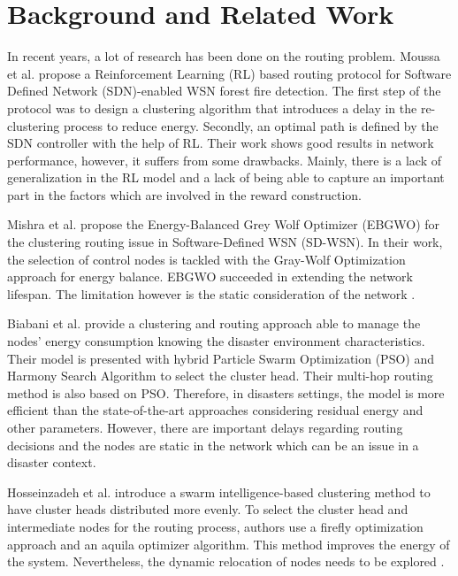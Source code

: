 \section{Background and Related Work}
In recent years, a lot of research has been done on the routing problem. Moussa et al. \cite{moussa_reinforcement_2023} propose a Reinforcement Learning (RL) based routing protocol for Software Defined Network (SDN)-enabled WSN forest fire detection. The first step of the protocol was to design a clustering algorithm that introduces a delay in the re-clustering process to reduce energy. Secondly, an optimal path is defined by the SDN controller with the help of RL. Their work shows good results in network performance, however, it suffers from some drawbacks. Mainly, there is a lack of generalization in the RL model and a lack of being able to capture an important part in the factors which are involved in the reward construction. 

Mishra et al. \cite{mishra_meta-heuristic-based_2021} propose the Energy-Balanced Grey Wolf Optimizer (EBGWO) for the clustering routing issue in Software-Defined WSN (SD-WSN). In their work, the selection of control nodes is tackled with the Gray-Wolf Optimization approach for energy balance. EBGWO succeeded in extending the network lifespan. The limitation however is the static consideration of the network \cite{isyaku_software_2024}. 

Biabani et al. \cite{biabani_energy-efficient_2020} provide a clustering and routing approach able to manage the nodes’ energy consumption knowing the disaster environment characteristics. Their model is presented with hybrid Particle Swarm Optimization (PSO) and Harmony Search Algorithm to select the cluster head. Their multi-hop routing method is also based on PSO. Therefore, in disasters settings, the model is more efficient than the state-of-the-art approaches considering residual energy and other parameters. However, there are important delays regarding routing decisions \cite{noauthor_survey_nodate} and the nodes are static in the network \cite{biabani_energy-efficient_2020} which can be an issue in a disaster context. 

Hosseinzadeh et al. \cite{hosseinzadeh_hybrid_2022} introduce a swarm intelligence-based clustering method to have cluster heads distributed more evenly. To select the cluster head and intermediate nodes for the routing process, authors use a firefly optimization approach and an aquila optimizer algorithm. This method improves the energy of the system. Nevertheless, the dynamic relocation of nodes needs to be explored \cite{senkumar_enhanced_2024}. 

